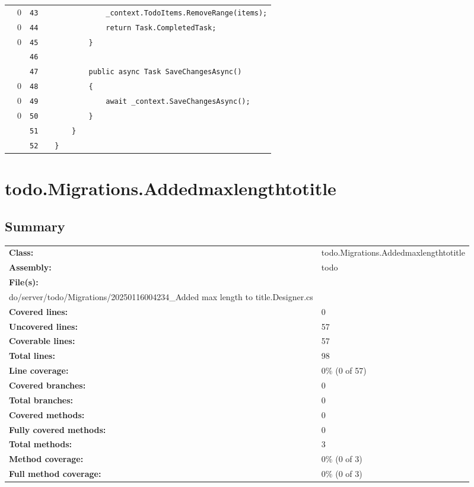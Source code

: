 \documentclass[a4paper,landscape,10pt]{article}
\begin{document}
\begin{longtable}[l]{lrrll}
\cellcolor{red} & 0 & \verb~43~ & & \verb~            _context.TodoItems.RemoveRange(items);~\\
\cellcolor{red} & 0 & \verb~44~ & & \verb~            return Task.CompletedTask;~\\
\cellcolor{red} & 0 & \verb~45~ & & \verb~        }~\\
\cellcolor{gray} &  & \verb~46~ & & \verb~~\\
\cellcolor{gray} &  & \verb~47~ & & \verb~        public async Task SaveChangesAsync()~\\
\cellcolor{red} & 0 & \verb~48~ & & \verb~        {~\\
\cellcolor{red} & 0 & \verb~49~ & & \verb~            await _context.SaveChangesAsync();~\\
\cellcolor{red} & 0 & \verb~50~ & & \verb~        }~\\
\cellcolor{gray} &  & \verb~51~ & & \verb~    }~\\
\cellcolor{gray} &  & \verb~52~ & & \verb~}~\\
\end{longtable}
\newpage
\section{todo.Migrations.Addedmaxlengthtotitle}
\subsection{Summary}
\begin{longtable}[l]{ll}
\textbf{Class:} & todo.Migrations.Addedmaxlengthtotitle\\
\textbf{Assembly:} & todo\\
\textbf{File(s):} & \begin{minipage}[t]{12cm}{s/4-Cs/todo/server/todo/Migrations/20250116004234\_Added max length to title.cs\\do/server/todo/Migrations/20250116004234\_Added max length to title.Designer.cs}\end{minipage} \\
\textbf{Covered lines:} & 0\\
\textbf{Uncovered lines:} & 57\\
\textbf{Coverable lines:} & 57\\
\textbf{Total lines:} & 98\\
\textbf{Line coverage:} & 0\% (0 of 57)\\
\textbf{Covered branches:} & 0\\
\textbf{Total branches:} & 0\\
\textbf{Covered methods:} & 0\\
\textbf{Fully covered methods:} & 0\\
\textbf{Total methods:} & 3\\
\textbf{Method coverage:} & 0\% (0 of 3)\\
\textbf{Full method coverage:} & 0\% (0 of 3)\\
\end{longtable}
\end{document}
